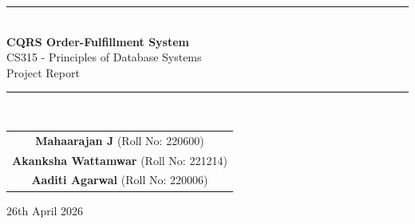 \documentclass[11pt,a4paper]{article}
\begin{document}
\begin{titlepage}
  \centering
  \vspace*{5.5cm}
  {\color{primary}\rule{\textwidth}{1pt}}\\[0.6cm]
  {\Huge\bfseries CQRS Order-Fulfillment System}\\[0.4cm]
  {\Large CS315 - Principles of Database Systems}\\[0.4cm]
  {\Large Project Report}\\[0.4cm]
  {\color{primary}\rule{\textwidth}{1pt}}\\[2.0cm]

  

  \vspace{-0.5cm}


\begin{tabular}{c}
\textbf{Mahaarajan J} \quad (Roll No: 220600) \\[0.4cm]
\textbf{Akanksha Wattamwar} \quad (Roll No: 221214) \\[0.4cm]
\textbf{Aaditi Agarwal} \quad (Roll No: 220006)
\end{tabular}

  \vspace{2cm}
{\large 26th April 2026}
\end{titlepage}

\tableofcontents
\newpage

\end{document}
